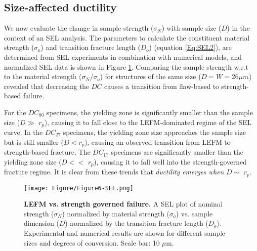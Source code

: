 \documentclass[11pt]{article}
\providecommand{\um}[0]{$\mu m$}
\providecommand{\rp}[0]{$r_p$}
\providecommand{\DC}[0]{$DC$}
\providecommand{\DCi}[0]{$DC_{17}$}
\providecommand{\DCj}[0]{$DC_{27}$}
\providecommand{\DCk}[0]{$DC_{80}$}
\begin{document}
        \subsection{Size-affected ductility}
        We now evaluate the change in sample strength ($\sigma_N$) with sample size ($D$) in the context of an SEL analysis.
        The parameters to calculate the constituent material strength ($\sigma_o$) and transition fracture length ($D_o$) (equation \ref{Eq:SEL2}), are determined from SEL experiments in combination with numerical models, and normalized SEL data is shown in Figure \ref{fig:Figure6}.
        Comparing the sample strength w.r.t to the material strength ($\sigma_N/\sigma_o$) for structures of the same size ($D=W=$26\um{}) revealed that decreasing the \DC{} causes a transition from flaw-based to strength-based failure.
        
        For the \DCk{} specimens, the yielding zone is significantly smaller than the sample size ($D\gg$ \rp{}), causing it to fall close to the LEFM-dominated regime of the SEL curve.
        In the \DCj{} specimens, the yielding zone size approaches the sample size but is still smaller ($D<$\rp{}), causing an observed transition from LEFM to strength-based fracture.
        The \DCi{} specimens are significantly smaller than the yielding zone size ($D<<$ \rp{}), causing it to fall well into the strength-governed fracture regime.
        It is clear from these trends that \textit{ductility emerges when $D \sim$ \rp{}}.

        \begin{figure}[h!]
            \centering
                \texttt{[image: Figure/Figure6-SEL.png]}
                \caption{\textbf{LEFM vs. strength governed failure.} 
                A SEL plot of nominal strength ($\sigma_N$) normalized by material strength ($\sigma_o$) vs. sample dimension ($D$) normalized by the transition fracture length ($D_o$). Experimental and numerical results are shown for different sample sizes and degrees of conversion. Scale bar: 10 $\mu$m.}
                \label{fig:Figure6}
        \end{figure}
        
\end{document}
